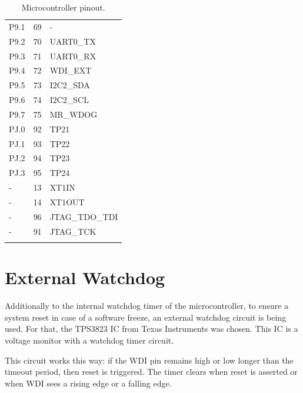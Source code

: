 \begin{longtable}{lcl}
    P9.1              & 69                  & -                     \\
    P9.2              & 70                  & UART0\_TX             \\
    P9.3              & 71                  & UART0\_RX             \\
    P9.4              & 72                  & WDI\_EXT              \\
    P9.5              & 73                  & I2C2\_SDA             \\
    P9.6              & 74                  & I2C2\_SCL             \\
    P9.7              & 75                  & MR\_WDOG              \\
    \midrule
    PJ.0              & 92                  & TP21                  \\
    PJ.1              & 93                  & TP22                  \\
    PJ.2              & 94                  & TP23                  \\
    PJ.3              & 95                  & TP24                  \\
    \midrule
    -                 & 13                  & XT1IN                 \\
    -                 & 14                  & XT1OUT                \\
    -                 & 96                  & JTAG\_TDO\_TDI        \\
    -                 & 91                  & JTAG\_TCK             \\
    \bottomrule[1.5pt]
    \caption{Microcontroller pinout.}
    \label{tab:mcu-pinout}
\end{longtable}

\section{External Watchdog}

Additionally to the internal watchdog timer of the microcontroller, to ensure a system reset in case of a software freeze, an external watchdog circuit is being used. For that, the TPS3823 IC from Texas Instruments was chosen. This IC is a voltage monitor with a watchdog timer circuit.

This circuit works this way: if the WDI pin remains high or low longer than the timeout period, then reset is triggered. The timer clears when reset is asserted or when WDI sees a rising edge or a falling edge.


